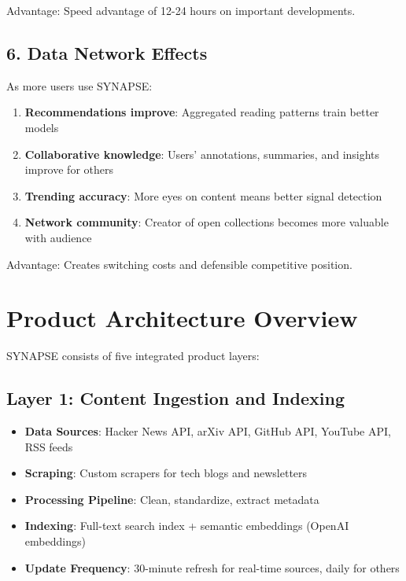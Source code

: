 \documentclass{report}
\begin{document}
Advantage: Speed advantage of 12-24 hours on important developments.

\subsection{6. Data Network Effects}

As more users use SYNAPSE:

\begin{enumerate}
    \item \textbf{Recommendations improve}: Aggregated reading patterns train better models
    \item \textbf{Collaborative knowledge}: Users' annotations, summaries, and insights improve for others
    \item \textbf{Trending accuracy}: More eyes on content means better signal detection
    \item \textbf{Network community}: Creator of open collections becomes more valuable with audience
\end{enumerate}

Advantage: Creates switching costs and defensible competitive position.

\section{Product Architecture Overview}

SYNAPSE consists of five integrated product layers:

\subsection{Layer 1: Content Ingestion and Indexing}

\begin{itemize}
    \item \textbf{Data Sources}: Hacker News API, arXiv API, GitHub API, YouTube API, RSS feeds
    \item \textbf{Scraping}: Custom scrapers for tech blogs and newsletters
    \item \textbf{Processing Pipeline}: Clean, standardize, extract metadata
    \item \textbf{Indexing}: Full-text search index + semantic embeddings (OpenAI embeddings)
    \item \textbf{Update Frequency}: 30-minute refresh for real-time sources, daily for others
\end{itemize}
\end{document}
